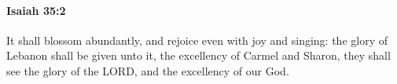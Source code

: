 
		\paragraph{Isaiah 35:2} %
			\label{ISAIAH-35-2}

			It shall blossom abundantly, and rejoice even with joy and singing: the glory of Lebanon shall be given unto it, the excellency of Carmel and Sharon, they shall see the glory of the LORD, and the excellency of our God.


